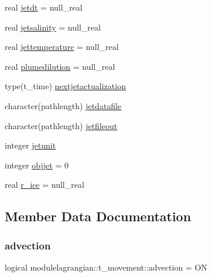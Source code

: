 \begin{DoxyCompactItemize}
\item 
real \mbox{\hyperlink{structmodulelagrangian_1_1t__movement_aa56d9b81099549351bdf7dde42e00ccf}{jetdt}} = null\+\_\+real
\item 
real \mbox{\hyperlink{structmodulelagrangian_1_1t__movement_ae01adc3e76d2d0d48be0c4823552051a}{jetsalinity}} = null\+\_\+real
\item 
real \mbox{\hyperlink{structmodulelagrangian_1_1t__movement_a0d227437cd26bdb2b4d66e58360c5595}{jettemperature}} = null\+\_\+real
\item 
real \mbox{\hyperlink{structmodulelagrangian_1_1t__movement_aefd519caa83510080bff637b21ea4634}{plumedilution}} = null\+\_\+real
\item 
type(t\+\_\+time) \mbox{\hyperlink{structmodulelagrangian_1_1t__movement_aa30b83c894861506ec0c45afbd2c7b68}{nextjetactualization}}
\item 
character(pathlength) \mbox{\hyperlink{structmodulelagrangian_1_1t__movement_ac36b32909d1b8813600bf33403e3a738}{jetdatafile}}
\item 
character(pathlength) \mbox{\hyperlink{structmodulelagrangian_1_1t__movement_a76390c2dbcc7ebe5474f925f1c240f8e}{jetfileout}}
\item 
integer \mbox{\hyperlink{structmodulelagrangian_1_1t__movement_a8e5bc77767d5a0bbcc88ed6084db4fbd}{jetunit}}
\item 
integer \mbox{\hyperlink{structmodulelagrangian_1_1t__movement_aba7fdc85821d48fdf8c52b02e87bc1d1}{objjet}} = 0
\item 
real \mbox{\hyperlink{structmodulelagrangian_1_1t__movement_a60d81b1ce1692bc3a1824d464c942778}{r\+\_\+ice}} = null\+\_\+real
\end{DoxyCompactItemize}


\subsection{Member Data Documentation}
\mbox{\label{structmodulelagrangian_1_1t__movement_a0de3604c8541423b7cf68c2137b0a57f}} 
\subsubsection{\texorpdfstring{advection}{advection}}
{\footnotesize\ttfamily logical modulelagrangian\+::t\+\_\+movement\+::advection = ON\hspace{0.3cm}{\ttfamily [private]}}

